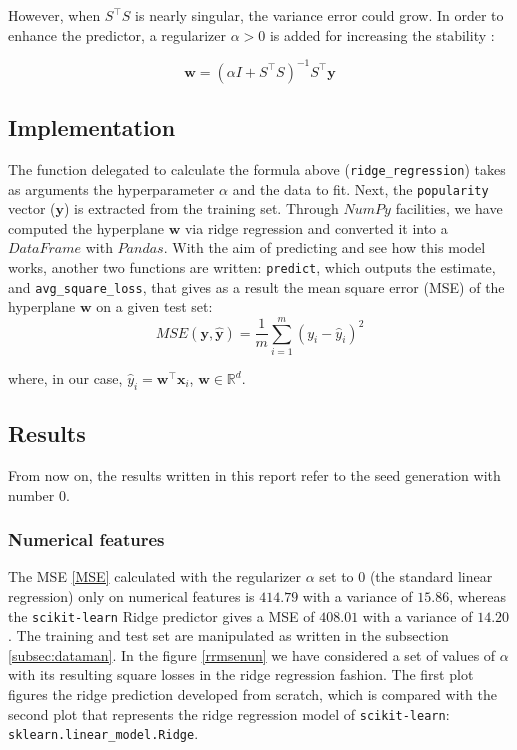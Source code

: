 \documentclass{article}
\begin{document}
However, when $S^\top S$ is nearly singular, the variance error could grow. In order to enhance the predictor, a regularizer $\alpha > 0$ is added for increasing the stability \cite{profrr}:

\begin{equation}
\label{rr}
	\boldsymbol{w} = (\alpha I + S^\top S)^{-1}S^\top \boldsymbol{y}
\end{equation}

\subsection{Implementation}
The function delegated to calculate the formula above (\texttt{ridge\_regression}) takes as arguments the hyperparameter $\alpha$ and the data to fit. Next, the \texttt{popularity} vector ($\boldsymbol{y}$) is extracted from the training set. Through $NumPy$ facilities, we have computed the hyperplane $\boldsymbol{w}$ via ridge regression and converted it into a $DataFrame$ with $Pandas$. 
With the aim of predicting and see how this model works, another two functions are written:
\texttt{predict}, which outputs the estimate, and \texttt{avg\_square\_loss}, that gives as a result the mean square error (MSE) of the hyperplane $\boldsymbol{w}$ on a given test set: 
\begin{equation}
	\label{MSE}MSE(\boldsymbol{y},\boldsymbol{\hat{y}}) = \frac{1}{m}\sum_{i = 1}^m (y_i-\hat{y}_i)^2
\end{equation}
    
where, in our case, $\hat{y}_i= \boldsymbol{w}^\top \boldsymbol{x}_i$, $\boldsymbol{w} \in \mathbb{R}^d$.
    
\subsection{Results}
From now on, the results written in this report refer to the seed generation with number $0$.
\subsubsection{Numerical features}

The MSE \eqref{MSE} calculated with the regularizer $\alpha$ set to $0$ (the standard linear regression) only on numerical features is $414.79$ with a variance of $15.86$, whereas the \texttt{scikit-learn} Ridge predictor gives a MSE of $408.01$ with a variance of $14.20$. The training and test set are manipulated as written in the subsection \ref{subsec:dataman}. In the figure \ref{rrmsenun} we have considered a set of values of $\alpha$ with its resulting square losses in the ridge regression fashion. The first plot figures the ridge prediction developed from scratch, which is compared with the second plot that represents the ridge regression model of \texttt{scikit-learn}: \texttt{sklearn.linear\_model.Ridge}. 
\end{document}
